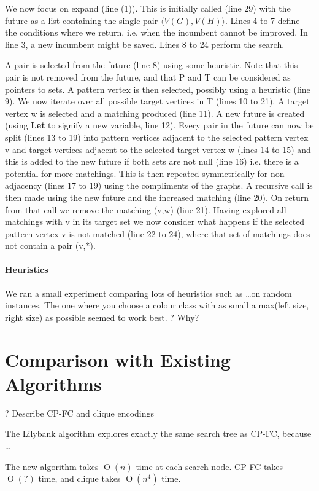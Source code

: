 \documentclass[letterpaper]{article}
\newcommand{\BigO}[1]{\ensuremath{\operatorname{O}\left(#1\right)}}
\begin{document}
We now focus on expand (line (1)). This is initially called (line 29) with the future as a list containing the single pair $\langle V(G),V(H) \rangle$. Lines 4 to 7 define the conditions 
where we return, i.e. when the incumbent cannot be improved. In line 3, a new incumbent might be saved. Lines 8 to 24 perform the search.

A pair is selected from the future (line 8) using some heuristic. Note that this pair is not removed from the future, and that P and T can be considered as pointers to sets. A pattern vertex is then selected, possibly using a heuristic (line 9). We now iterate over all possible target vertices in T (lines 10 to 21). A target vertex w is selected and a matching produced (line 11). A new future is created (using {\bf Let} to signify a new variable, line 12). Every pair in the future can now be split (lines 13 to 19) into pattern vertices adjacent to the selected pattern vertex v and target vertices adjacent to the selected target vertex w (lines 14 to 15) and this is added to the new future if both sets are not null (line 16) i.e. there is a potential for more matchings. This is then repeated symmetrically for non-adjacency (lines 17 to 19) using the compliments of the graphs.
A recursive call is then made using the new future and the increased matching (line 20). On return from that call we remove the matching (v,w) (line 21). Having explored all matchings with v in its target set we now consider what happens if the selected pattern vertex v is not matched (line 22 to 24), where that set of matchings does not contain a pair (v,*).

\paragraph{Heuristics} We ran a small experiment comparing lots of heuristics
such as \dots on random instances. The one where you choose a colour class with
as small a max(left size, right size) as possible seemed to work best. ? Why?

\section{Comparison with Existing Algorithms}

? Describe CP-FC and clique encodings

The Lilybank algorithm explores exactly the same search tree as CP-FC, because \dots

The new algorithm takes $\BigO{n}$ time at each search node. CP-FC takes $\BigO{?}$ time,
and clique takes $\BigO{n^4}$ time.
\end{document}
